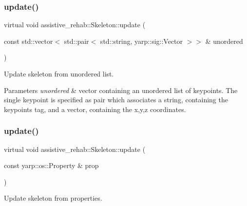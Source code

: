 \subsubsection{\texorpdfstring{update()}{update()}\hspace{0.1cm}{\footnotesize\ttfamily [2/3]}}
{\footnotesize\ttfamily virtual void assistive\+\_\+rehab\+::\+Skeleton\+::update (\begin{DoxyParamCaption}\item[{const std\+::vector$<$ std\+::pair$<$ std\+::string, yarp\+::sig\+::\+Vector $>$$>$ \&}]{unordered }\end{DoxyParamCaption})\hspace{0.3cm}{\ttfamily [virtual]}}



Update skeleton from unordered list. 


\begin{DoxyParams}{Parameters}
{\em unordered} & vector containing an unordered list of keypoints. The single keypoint is specified as pair which associates a string, containing the keypoint\textquotesingle{}s tag, and a vector, containing the x,y,z coordinates. \\
\hline
\end{DoxyParams}
\mbox{\label{classassistive__rehab_1_1Skeleton_ae3346b2f363e1812fdc88e59d1f7bf7d}} 
\subsubsection{\texorpdfstring{update()}{update()}\hspace{0.1cm}{\footnotesize\ttfamily [3/3]}}
{\footnotesize\ttfamily virtual void assistive\+\_\+rehab\+::\+Skeleton\+::update (\begin{DoxyParamCaption}\item[{const yarp\+::os\+::\+Property \&}]{prop }\end{DoxyParamCaption})\hspace{0.3cm}{\ttfamily [virtual]}}



Update skeleton from properties. 


